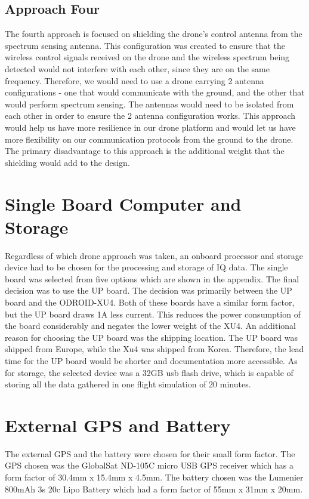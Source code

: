 \subsection{Approach Four}
The fourth approach is focused on shielding the drone’s control antenna from the spectrum sensing antenna. This configuration was created to ensure that the wireless control signals received on the drone and the wireless spectrum being detected would not interfere with each other, since they are on the same frequency. Therefore, we would need to use a drone carrying 2 antenna configurations - one that would communicate with the ground, and the other that would perform spectrum sensing. The antennas would need to be isolated from each other in order to ensure the 2 antenna configuration works. This approach would help us have more resilience in our drone platform and would let us have more flexibility on our communication protocols from the ground to the drone. The primary disadvantage to this approach is the additional weight that the shielding would add to the design.

\section{Single Board Computer and Storage}
Regardless of which drone approach was taken, an onboard processor and storage device had to be chosen for the processing and storage of IQ data. The single board was selected from five options which are shown in the appendix. The final decision was to use the UP board. The decision was primarily between the UP board and the ODROID-XU4. Both of these boards have a similar form factor, but the UP board draws 1A less current. This reduces the power consumption of the board considerably and negates the lower weight of the XU4. An additional reason for choosing the UP board was the shipping location. The UP board was shipped from Europe, while the Xu4 was shipped from Korea. Therefore, the lead time for the UP board would be shorter and documentation more accessible. As for storage, the selected device was a 32GB usb flash drive, which is capable of storing all the data gathered in one flight simulation of 20 minutes.

\section{External GPS and Battery}
The external GPS and the battery were chosen for their small form factor. The GPS chosen was the GlobalSat ND-105C micro USB GPS receiver which has a form factor of 30.4mm x 15.4mm x 4.5mm. The battery chosen was the Lumenier 800mAh 3s 20c Lipo Battery which had a form factor of 55mm x 31mm x 20mm.

